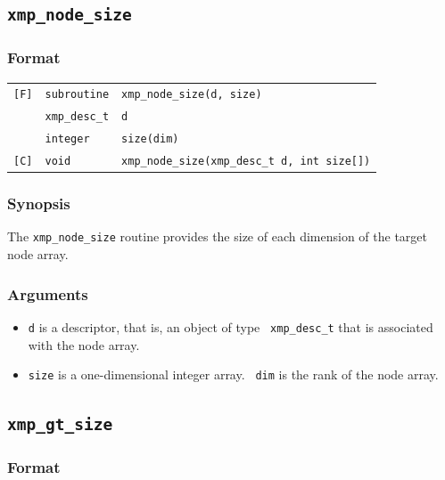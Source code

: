 \subsection{\tt xmp\_node\_size}

\subsubsection*{Format}

\begin{tabular}{lll}

\verb![F]!& {\tt subroutine}& {\tt xmp\_node\_size(d, size)}\\
          & {\tt xmp\_desc\_t} & {\tt d}\\
          & {\tt integer} & {\tt size(dim)}\\

\verb![C]!&  {\tt void}& {\tt xmp\_node\_size(xmp\_desc\_t d, int size[])}\\

\end{tabular}

\subsubsection*{Synopsis}

The {\tt xmp\_node\_size} routine provides the size of each dimension of
the target node array.

\subsubsection*{Arguments}

\begin{itemize}
 \item {\tt d} is a descriptor, that is, an object of type {\tt
       xmp\_desc\_t} that is associated with the node array.
 \item {\tt size} is a one-dimensional integer array. {\tt
       dim} is the rank of the node array.
\end{itemize}

\subsection{\tt xmp\_gt\_size}

\subsubsection*{Format}


